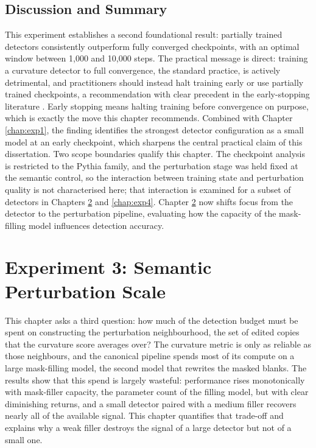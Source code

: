 \documentclass[logo,msc,cs]{infthesis}      %
\begin{document}
\section{Discussion and Summary}
\label{sec:exp2_summary}
This experiment establishes a second foundational result: partially trained detectors consistently outperform fully converged checkpoints, with an optimal window between 1,000 and 10,000 steps. The practical message is direct: training a curvature detector to full convergence, the standard practice, is actively detrimental, and practitioners should instead halt training early or use partially trained checkpoints, a recommendation with clear precedent in the early-stopping literature \citep{prechelt2002early}. Early stopping means halting training before convergence on purpose, which is exactly the move this chapter recommends.
Combined with Chapter \ref{chap:exp1}, the finding identifies the strongest detector configuration as a small model at an early checkpoint, which sharpens the central practical claim of this dissertation. Two scope boundaries qualify this chapter. The checkpoint analysis is restricted to the Pythia family, and the perturbation stage was held fixed at the semantic control, so the interaction between training state and perturbation quality is not characterised here; that interaction is examined for a subset of detectors in Chapters \ref{chap:exp3} and \ref{chap:exp4}. Chapter \ref{chap:exp3} now shifts focus from the detector to the perturbation pipeline, evaluating how the capacity of the mask-filling model influences detection accuracy.

\chapter{Experiment 3: Semantic Perturbation Scale}
\label{chap:exp3}
This chapter asks a third question: how much of the detection budget must be spent on constructing the perturbation neighbourhood, the set of edited copies that the curvature score averages over? The curvature metric is only as reliable as those neighbours, and the canonical pipeline spends most of its compute on a large mask-filling model, the second model that rewrites the masked blanks. The results show that this spend is largely wasteful: performance rises monotonically with mask-filler capacity, the parameter count of the filling model, but with clear diminishing returns, and a small detector paired with a medium filler recovers nearly all of the available signal. This chapter quantifies that trade-off and explains why a weak filler destroys the signal of a large detector but not of a small one.
\end{document}
